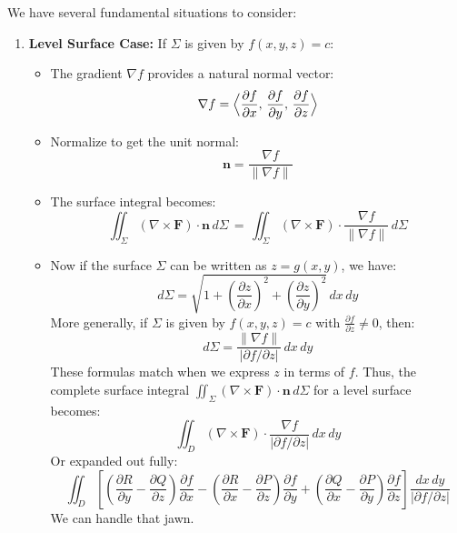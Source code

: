 \noindent We have several fundamental situations to consider:

\begin{enumerate}
    \item \textbf{Level Surface Case:} If $\Sigma$ is given by $f(x,y,z) = c$:
    \begin{itemize}
        \item The gradient $\nabla f$ provides a natural normal vector:
        \[
        \nabla f = \Bigl\langle 
        \frac{\partial f}{\partial x},\,
        \frac{\partial f}{\partial y},\,
        \frac{\partial f}{\partial z}
        \Bigr\rangle
        \]
        \item Normalize to get the unit normal:
        \[
        \mathbf{n} = \frac{\nabla f}{\|\nabla f\|}
        \]
        \item The surface integral becomes:
        \[
        \iint_{\Sigma} (\nabla \times \mathbf{F}) \cdot \mathbf{n}\,d\Sigma 
        \,=\,
        \iint_{\Sigma}
        (\nabla \times \mathbf{F}) \cdot \frac{\nabla f}{\|\nabla f\|}\,d\Sigma
        \]
\item Now if the surface $\Sigma$ can be written as $z = g(x,y)$, we have:
       \[
       d\Sigma = \sqrt{1 + \left(\frac{\partial z}{\partial x}\right)^2 + \left(\frac{\partial z}{\partial y}\right)^2}\,dx\,dy
       \]
       More generally, if $\Sigma$ is given by $f(x,y,z) = c$ with $\frac{\partial f}{\partial z} \neq 0$, then:
       \[
       d\Sigma = \frac{\|\nabla f\|}{|\partial f/\partial z|}\,dx\,dy
       \]
       These formulas match when we express $z$ in terms of $f$. Thus, the complete surface integral $\iint_{\Sigma} (\nabla \times \mathbf{F}) \cdot \mathbf{n}\,d\Sigma $ for a level surface becomes:
\[
\iint_{D} (\nabla \times \mathbf{F}) \cdot \frac{\nabla f}{|\partial f/\partial z|}\,dx\,dy
\]
Or expanded out fully:
\[
\iint_{D} \left[\left( \frac{\partial R}{\partial y} - \frac{\partial Q}{\partial z} \right)\frac{\partial f}{\partial x}
- \left( \frac{\partial R}{\partial x} - \frac{\partial P}{\partial z} \right)\frac{\partial f}{\partial y}
+ \left( \frac{\partial Q}{\partial x} - \frac{\partial P}{\partial y} \right)\frac{\partial f}{\partial z}\right]
\frac{dx\,dy}{|\partial f/\partial z|}
\]
We can handle that jawn.
    \end{itemize}


\end{enumerate}
